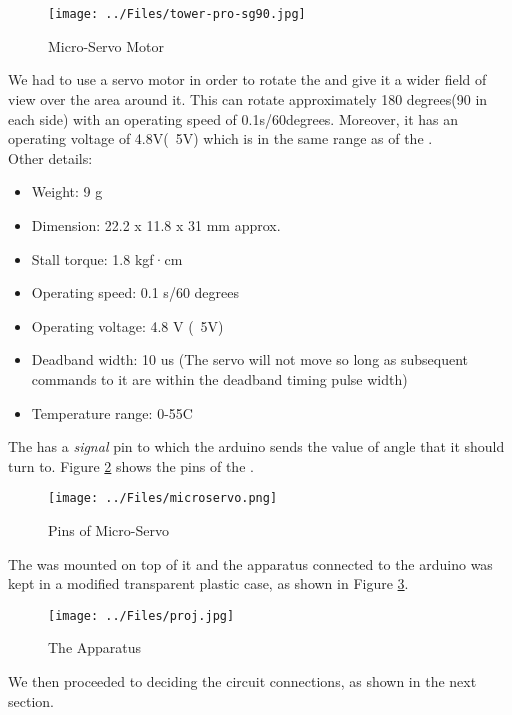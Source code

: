 \section{ \servo{} \motor{}}
\begin{figure}[H]
	\centering
	\texttt{[image: ../Files/tower-pro-sg90.jpg]}
	\caption{Micro-Servo Motor}  \label{fig:Servo}
\end{figure}
We had to use a servo motor in order to rotate the \hcsr{} and give it a wider field of view over the area around it. This \servo{} can rotate approximately 180 degrees(90 in each side) with an operating speed of 0.1s/60degrees. Moreover, it has an operating voltage of 4.8V(~5V) which is in the same range as of the \arduinouno{}.\\
Other details:
\begin{itemize}
	\item Weight: 9 g
	\item Dimension: 22.2 x 11.8 x 31 mm approx.
	\item Stall torque: 1.8 kgf·cm
	\item Operating speed: 0.1 s/60 degrees
	\item Operating voltage: 4.8 V (~5V)
	\item Deadband width: 10 us (The servo will not move so long as subsequent commands to it are within the deadband timing pulse width)
	\item Temperature range: 0-55C
\end{itemize}
The \servo{} has a \emph{signal} pin to which the arduino sends the value of angle that it should turn to. Figure \ref{fig:pinServo} shows the pins of the \servo{}.
\begin{figure}[H]
	\centering
	\texttt{[image: ../Files/microservo.png]}
	\caption{Pins of Micro-Servo}  \label{fig:pinServo}
\end{figure}
The \ultrasonic{} was mounted on top of it and the apparatus connected to the arduino was kept in a modified transparent plastic case, as shown in Figure \ref{fig:projphoto}.
\begin{figure}[H]
	\centering
	\texttt{[image: ../Files/proj.jpg]}
	\caption{The Apparatus}  \label{fig:projphoto}
\end{figure}
We then proceeded to deciding the circuit connections, as shown in the next section.
\clearpage